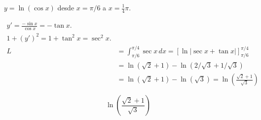 $y=\ln(\cos x)$ desde $x=\pi/6$ a $x=\frac{1}{4} \pi$.

\nopagebreak
\begin{align*}
y' = \frac{-\sin x}{\cos x} = -\tan x. \\
1+(y')^2 = 1+\tan^2 x = \sec^2 x. \\
L &= \int_{\pi/6}^{\pi/4} \sec x \, dx = [\ln|\sec x + \tan x|]_{\pi/6}^{\pi/4} \\
&= \ln(\sqrt{2}+1) - \ln(2/\sqrt{3} + 1/\sqrt{3}) \\
&= \ln(\sqrt{2}+1) - \ln(\sqrt{3}) = \ln\left(\frac{\sqrt{2}+1}{\sqrt{3}}\right)
\end{align*}

\[
\boxed{\displaystyle \ln\left(\frac{\sqrt{2}+1}{\sqrt{3}}\right)}
\]
